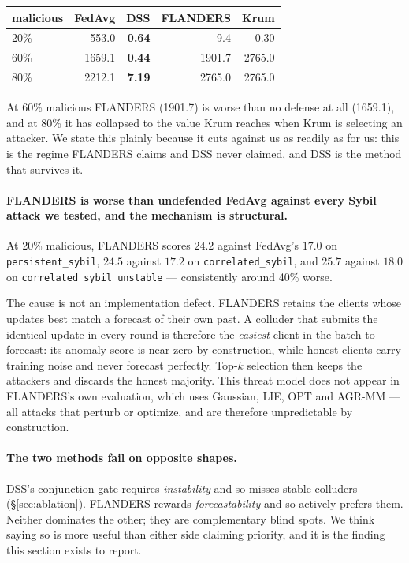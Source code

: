 \documentclass[11pt,a4paper]{article}
\begin{document}
\begin{center}
\begin{tabular}{lrrrr}
\hline
malicious & FedAvg & DSS & FLANDERS & Krum \\
\hline
20\% & 553.0 & \textbf{0.64} & 9.4 & 0.30 \\
60\% & 1659.1 & \textbf{0.44} & 1901.7 & 2765.0 \\
80\% & 2212.1 & \textbf{7.19} & 2765.0 & 2765.0 \\
\hline
\end{tabular}
\end{center}

At 60\% malicious FLANDERS (1901.7) is worse than no defense at all
(1659.1), and at 80\% it has collapsed to the value Krum reaches when
Krum is selecting an attacker. We state this plainly because it cuts
against us as readily as for us: this is the regime FLANDERS claims and
DSS never claimed, and DSS is the method that survives it.

\paragraph{FLANDERS is worse than undefended FedAvg against every Sybil
attack we tested, and the mechanism is structural.} At 20\% malicious,
FLANDERS scores $24.2$ against FedAvg's $17.0$ on
\texttt{persistent\_sybil}, $24.5$ against $17.2$ on
\texttt{correlated\_sybil}, and $25.7$ against $18.0$ on
\texttt{correlated\_sybil\_unstable} --- consistently around 40\% worse.

The cause is not an implementation defect. FLANDERS retains the clients
whose updates best match a forecast of their own past. A colluder that
submits the identical update in every round is therefore the
\emph{easiest} client in the batch to forecast: its anomaly score is near
zero by construction, while honest clients carry training noise and never
forecast perfectly. Top-$k$ selection then keeps the attackers and
discards the honest majority. This threat model does not appear in
FLANDERS's own evaluation, which uses Gaussian, LIE, OPT and AGR-MM ---
all attacks that perturb or optimize, and are therefore unpredictable by
construction.

\paragraph{The two methods fail on opposite shapes.} DSS's conjunction
gate requires \emph{instability} and so misses stable colluders
(\S\ref{sec:ablation}). FLANDERS rewards \emph{forecastability} and so
actively prefers them. Neither dominates the other; they are
complementary blind spots. We think saying so is more useful than either
side claiming priority, and it is the finding this section exists to
report.
\end{document}
